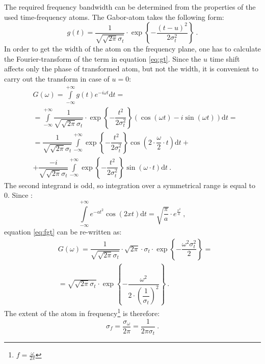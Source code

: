 \documentclass[a4paper,12pt,oneside]{article}
\newcommand{\dt}{\mathrm{d}t}
\begin{document}
The required frequency bandwidth can be determined from the properties of the used time-frequency atoms. The Gabor-atom takes the following form:
\begin{equation}\label{eq:gt}
  g(t) = \frac{1}{\sqrt{\sqrt{2\pi}\sigma_t}} \cdot \exp\left\{-\frac{(t-u)^2}{2\sigma_t^2}\right\} \ .
\end{equation}
In order to get the width of the atom on the frequency plane, one has to calculate the Fourier-transform of the term in equation \eqref{eq:gt}. Since the $u$ time shift affects only the phase of transformed atom, but not the width, it is convenient to carry out the transform in case of $u=0$:
\begin{eqnarray}\label{eq:fgt}
  & G(\omega) = \int\limits_{-\infty}^{+\infty} g(t) e^{-i\omega t} \dt = \nonumber\\
  & = \int\limits_{-\infty}^{+\infty} \dfrac{1}{\sqrt{\sqrt{2\pi}\sigma_t}} \cdot \exp\left\{-\dfrac{t^2}{2\sigma_t^2}\right\} \left( \cos(\omega t) - i\sin(\omega t) \right) \dt  = \nonumber\\
  & = \dfrac{1}{\sqrt{\sqrt{2\pi}\sigma_t}} \int\limits_{-\infty}^{+\infty} \exp\left\{-\dfrac{t^2}{2\sigma_t^2}\right\} \cos\left(2 \cdot \dfrac{\omega}{2} \cdot  t \right) \dt + \nonumber\\
  & + \dfrac{-i}{\sqrt{\sqrt{2\pi}\sigma_t}} \int\limits_{-\infty}^{+\infty} \exp\left\{-\dfrac{t^2}{2\sigma_t^2}\right\} \sin(\omega \cdot  t) \dt \ .
\end{eqnarray}
The second integrand is odd, so integration over a symmetrical range is equal to 0. Since \cite{bronshtein07handbook}:
\begin{equation}\label{eq:first_int}
  \int\limits_{-\infty}^{+\infty} e^{-at^2} \cos(2xt) \dt = \sqrt{\dfrac{\pi}{a}} \cdot e^{\frac{x^2}{a}} \ ,
\end{equation}
equation \eqref{eq:fgt} can be re-written as:
\begin{eqnarray}\label{eq:second_int}
  & G(\omega) = \dfrac{1}{\sqrt{\sqrt{2\pi}\sigma_t}} \cdot \sqrt{2 \pi} \cdot \sigma_t \cdot \exp\left\{-\dfrac{\omega^2 \sigma_t^2}{2}\right\}  = \nonumber\\
  & = \sqrt{\sqrt{2\pi}\sigma_t} \cdot \exp\left\{-\dfrac{\omega^2}{2 \cdot \left( \dfrac{1}{\sigma_t} \right)^2}\right\} \ .
\end{eqnarray}
The extent of the atom in frequency\footnote{$f = \frac{\omega}{2\pi}$} is therefore:
\begin{equation}\label{eq:extent}
  \sigma_{f} = \dfrac{\sigma_{\omega}}{2 \pi} = \dfrac{1}{2 \pi \sigma_{t}} \ .
\end{equation}
\end{document}
